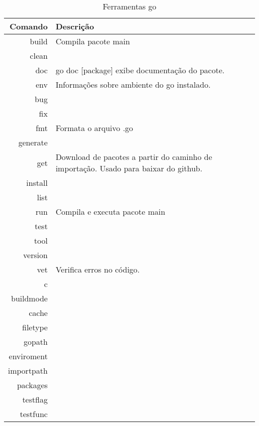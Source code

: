 \documentclass{apostila}
\begin{document}
\begin{table}[h]
\centering
\caption{Ferramentas go}
\vspace{0.5cm}
\begin{tabular}{r|l}
 
Comando 	& Descrição	\\
\hline
build 		& Compila pacote main       \\
clean		&  \\
doc 		& go doc [package] exibe documentação do pacote\cite[78]{goia}.        \\
    env 		& Informações sobre ambiente do go instalado\cite[9]{cod3r}.       \\
bug 		&        \\
fix 		&        \\
fmt 		& Formata o arquivo .go\cite[77]{goia}       \\
generate 	&        \\
get 		& Download de pacotes a partir do caminho de importação\cite[9]{cod3r}. Usado para baixar do github\cite[9]{cod3r}.       \\
install 	&        \\
list 		&        \\
run 		& Compila e executa pacote main\cite[76]{goia}       \\
test 		&       \\
tool 		&       \\
version 	&       \\
vet 		& Verifica erros no código\cite[9]{cod3r}.  \\
c			&       \\
buildmode 	&       \\
cache 		&       \\
filetype 	&       \\
gopath 		&       \\
enviroment 	&       \\
importpath 	&       \\
packages    &       \\
testflag    &       \\
testfunc    & 
 
\end{tabular}
\end{table}

\end{document}
